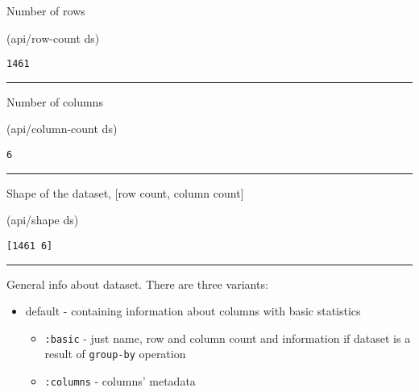 \documentclass[]{article}
\newenvironment{Shaded}{\begin{snugshade}}{\end{snugshade}}
\newcommand{\NormalTok}[1]{#1}
\providecommand{\tightlist}{%
  \setlength{\itemsep}{0pt}\setlength{\parskip}{0pt}}
\begin{document}
Number of rows

\begin{Shaded}
\begin{Highlighting}[]
\NormalTok{(api/row-count ds)}
\end{Highlighting}
\end{Shaded}

\begin{verbatim}
1461
\end{verbatim}

\begin{center}\rule{0.5\linewidth}{0.5pt}\end{center}

Number of columns

\begin{Shaded}
\begin{Highlighting}[]
\NormalTok{(api/column-count ds)}
\end{Highlighting}
\end{Shaded}

\begin{verbatim}
6
\end{verbatim}

\begin{center}\rule{0.5\linewidth}{0.5pt}\end{center}

Shape of the dataset, {[}row count, column count{]}

\begin{Shaded}
\begin{Highlighting}[]
\NormalTok{(api/shape ds)}
\end{Highlighting}
\end{Shaded}

\begin{verbatim}
[1461 6]
\end{verbatim}

\begin{center}\rule{0.5\linewidth}{0.5pt}\end{center}

General info about dataset. There are three variants:

\begin{itemize}
\tightlist
\item
  default - containing information about columns with basic statistics

  \begin{itemize}
  \tightlist
  \item
    \texttt{:basic} - just name, row and column count and information if
    dataset is a result of \texttt{group-by} operation
  \item
    \texttt{:columns} - columns' metadata
  \end{itemize}
\end{itemize}
\end{document}
